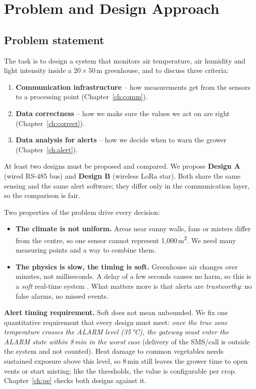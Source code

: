 \documentclass[11pt,a4paper]{report}
\begin{document}
\tableofcontents

\chapter{Problem and Design Approach}\label{ch:intro}

\section{Problem statement}
The task is to design a system that monitors air temperature, air humidity and light intensity inside a $20\times50$\,m greenhouse, and to discuss three criteria:
\begin{enumerate}[noitemsep]
  \item \textbf{Communication infrastructure} -- how measurements get from the sensors to a processing point (Chapter~\ref{ch:comm}).
  \item \textbf{Data correctness} -- how we make sure the values we act on are right (Chapter~\ref{ch:correct}).
  \item \textbf{Data analysis for alerts} -- how we decide when to warn the grower (Chapter~\ref{ch:alert}).
\end{enumerate}
At least two designs must be proposed and compared. We propose \textbf{Design A} (wired RS-485 bus) and \textbf{Design B} (wireless LoRa star). Both share the same sensing and the same alert software; they differ only in the communication layer, so the comparison is fair.

Two properties of the problem drive every decision:
\begin{itemize}
  \item \textbf{The climate is not uniform.} Areas near sunny walls, fans or misters differ from the centre, so one sensor cannot represent 1{,}000\,m\textsuperscript{2}. We need many measuring points and a way to combine them.
  \item \textbf{The physics is slow, the timing is soft.} Greenhouse air changes over minutes, not milliseconds. A delay of a few seconds causes no harm, so this is a \emph{soft} real-time system \cite{kopetz}. What matters more is that alerts are \emph{trustworthy}: no false alarms, no missed events.
\end{itemize}

\textbf{Alert timing requirement.}\label{sec:req} Soft does not mean unbounded. We fix one quantitative requirement that every design must meet: \emph{once the true zone temperature crosses the ALARM level (35\,°C), the gateway must enter the ALARM state within 8\,min in the worst case} (delivery of the SMS/call is outside the system and not counted). Heat damage to common vegetables needs sustained exposure above this level, so 8\,min still leaves the grower time to open vents or start misting; like the thresholds, the value is configurable per crop. Chapter~\ref{ch:pe} checks both designs against it.
\end{document}
